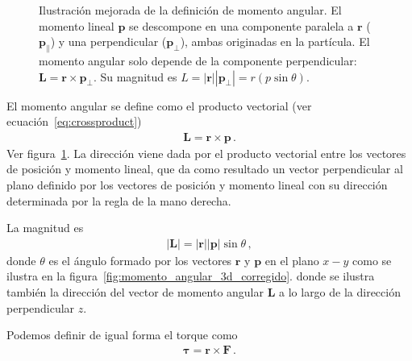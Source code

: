 \documentclass[11pt,a4paper]{book}
\begin{document}
\begin{figure}[h!]
    \caption{
        Ilustración mejorada de la definición de momento angular.
        El momento lineal $\boldsymbol{p}$ se descompone en una componente paralela a $\boldsymbol{r}$ ($\boldsymbol{p}_{\parallel}$) y una perpendicular ($\boldsymbol{p}_{\perp}$), ambas originadas en la partícula.
        El momento angular solo depende de la componente perpendicular: $\boldsymbol{L} = \boldsymbol{r} \times \boldsymbol{p}_{\perp}$.
        Su magnitud es $L = |\boldsymbol{r}| |\boldsymbol{p}_{\perp}| = r (p \sin\theta)$.
    }
    \label{fig:momento_angular_def_mejorada}
\end{figure}




El momento angular se define como el producto vectorial (ver ecuación~\eqref{eq:crossproduct})
\begin{align}
\label{eq:L}
    \boldsymbol{L} = \boldsymbol{r}\times \boldsymbol{p}\,.
\end{align}
Ver figura~\ref{fig:momento_angular_def_mejorada}. La dirección viene dada por el producto vectorial entre los vectores de posición y momento lineal, que da como resultado un vector perpendicular al plano definido por los vectores de posición y momento lineal con su dirección determinada por la regla de la mano derecha.

La magnitud es
\begin{align}
    |\boldsymbol{L}| = |\boldsymbol{r}| |\boldsymbol{p}|\sin\theta\,,
\end{align}
donde $\theta$ es el ángulo formado por los vectores $\boldsymbol{r}$ y $\boldsymbol{p}$ en el plano $x-y$ como se ilustra en la figura~\ref{fig:momento_angular_3d_corregido}. donde se ilustra también la dirección del vector de momento angular $\boldsymbol{L}$ a lo largo de la dirección perpendicular $z$.

Podemos definir de igual forma el torque como
\begin{align}
    \boldsymbol{\tau} =  \boldsymbol{r}\times \boldsymbol{F}\,.
\end{align}
\end{document}
